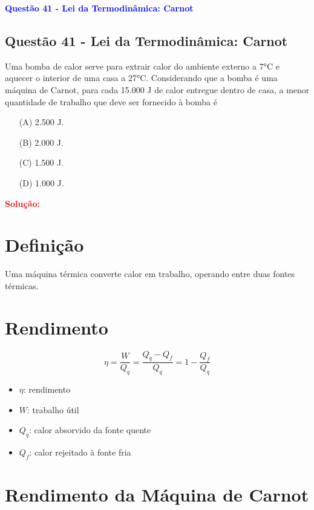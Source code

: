 \begin{flushleft}
\textbf{\textcolor{blue}{\Large Quest\~ao 41 - Lei da Termodinâmica: Carnot}}\\
\noindent
\subsection{Quest\~ao 41 - Lei da Termodinâmica: Carnot}
Uma bomba de calor serve para extrair calor do ambiente
externo a 7°C e aquecer o interior de uma casa a 27°C.
Considerando que a bomba é uma máquina de Carnot, para
cada 15.000 J de calor entregue dentro de casa, a menor
quantidade de trabalho que deve ser fornecido à bomba é

\begin{itemize}
\item[(A)] 2.500 J.
\item[(B)] 2.000 J.
\item[(C)] 1.500 J.
\item[(D)] 1.000 J.
\end{itemize}

\vspace{0.5cm}

\textcolor{red}{\textbf{Solução:}}\\

\section*{Definição}

Uma máquina térmica converte calor em trabalho, operando entre duas fontes térmicas.

\section*{Rendimento}

\[
\eta = \frac{W}{Q_q} = \frac{Q_q - Q_f}{Q_q} = 1 - \frac{Q_f}{Q_q}
\]

\begin{itemize}
  \item \( \eta \): rendimento
  \item \( W \): trabalho útil
  \item \( Q_q \): calor absorvido da fonte quente
  \item \( Q_f \): calor rejeitado à fonte fria
\end{itemize}

\section*{Rendimento da Máquina de Carnot}


\end{flushleft}
